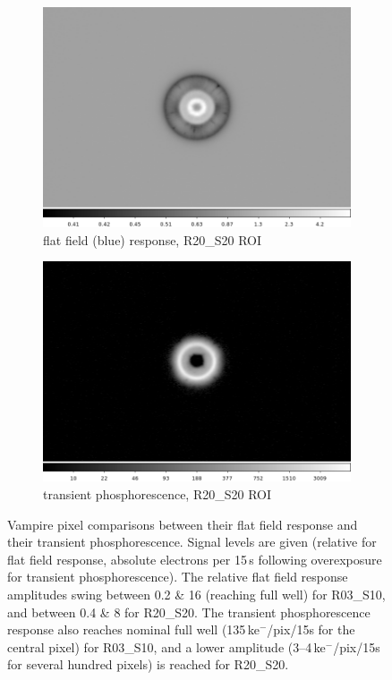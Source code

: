 \begin{figure}[!htbp]
\begin{subfigure}{0.45\textwidth}
    \includegraphics[width=\textwidth]{figures/phosphorescence-survey/vamp_comp_R20_S20_flatresp.png}
     \caption{flat field (blue) response, R20\_S20 ROI}
     \label{subfig:flatresp_R20_S20}
\end{subfigure}
\begin{subfigure}{0.45\textwidth}
    \includegraphics[width=\textwidth]{figures/phosphorescence-survey/vamp_comp_R20_S20_phosresp.png}
     \caption{transient phosphorescence, R20\_S20 ROI}
     \label{subfig:phosresp_R20_S20}
\end{subfigure}
\newline
\caption{Vampire pixel comparisons between their flat field response and their transient phosphorescence. Signal levels are given (relative for flat field response, absolute electrons per 15\,s following overexposure for transient phosphorescence). The relative flat field response amplitudes swing between 0.2 \& 16 (reaching full well) for R03\_S10, and between 0.4 \& 8 for R20\_S20. The transient phosphorescence response also reaches nominal full well (135\,ke$^-$/pix/15s for the central pixel) for R03\_S10, and a lower amplitude (3--4\,ke$^-$/pix/15s for several hundred pixels) is reached for R20\_S20.}
\label{fig:vamp-phos:R03_S10-R20_S20}
\end{figure}

